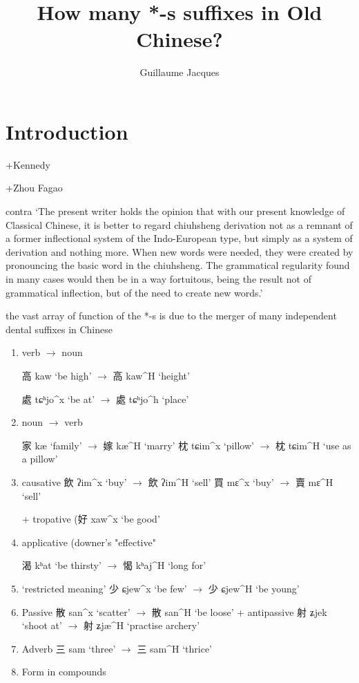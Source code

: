 \documentclass[oldfontcommands,oneside,a4paper,11pt]{article}
\newcommand{\ipa}[1]{{\phon \mbox{#1}}} %
\newcommand{\zh}[1]{{\cn #1}}
\newcommand{\ch}[3]{\zh{#1} \ipa{#2} `#3'}
\begin{document}
 
\title{How many *-s suffixes in Old Chinese? }
\author{Guillaume Jacques}
\maketitle
\linenumbers


\section{Introduction}
\citet{haudricourt54chinois}
\citet{downer59}



+Kennedy

+Zhou Fagao

contra \citet[262]{downer59}
`The present writer holds the opinion that with our present knowledge of Classical Chinese, it is better to regard chiuhsheng derivation not as a remnant of a former inflectional system of the Indo-European type, but simply as a system of derivation and nothing more. When new words were needed, they were created by pronouncing the basic word in the chiuhsheng. The grammatical regularity found in many cases would then be in a way fortuitous, being the result not of grammatical inflection, but of the need to create new words.'

the vast array of function of the *-s is due to the merger of many independent dental suffixes in Chinese


\begin{enumerate}
\item verb $\rightarrow$ noun 


\ch{高}{kaw}{be high} $\rightarrow$ \ch{高}{kaw^H}{height} 

\ch{處}{tɕʰjo^x}{be at} $\rightarrow$ \ch{處}{tɕʰjo^h}{place} 

\item noun $\rightarrow$ verb 

\ch{家}{kæ}{family} $\rightarrow$ \ch{嫁}{kæ^H}{marry} 
\ch{枕}{tɕim^x}{pillow} $\rightarrow$ \ch{枕}{tɕim^H}{use as a pillow} 

\item causative
\ch{飲}{ʔim^x}{buy} $\rightarrow$ \ch{飲}{ʔim^H}{sell} 
\ch{買}{mɛ^x}{buy} $\rightarrow$ \ch{賣}{mɛ^H}{sell} 


+ tropative (\ch{好}{xaw^x}{be good}
\item applicative (downer's "effective"

\ch{渴}{kʰat}{be thirsty} $\rightarrow$ \ch{愒}{kʰaj^H}{long for} 

\item `restricted meaning'
\ch{少}{ɕjew^x}{be few} $\rightarrow$ \ch{少}{ɕjew^H}{be young} 

\item Passive
\ch{散}{san^x}{scatter} $\rightarrow$ \ch{散}{san^H}{be loose} 
+ antipassive \ch{射}{ʑjek}{shoot at} $\rightarrow$ \ch{射}{ʑjæ^H}{practise archery} 

\item Adverb
\ch{三}{sam}{three} $\rightarrow$ \ch{三}{sam^H}{thrice} 

\item Form in compounds
\end{enumerate}
\end{document}
